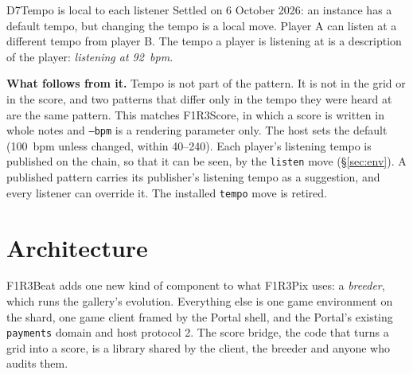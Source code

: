\documentclass[11pt,a4paper]{article}
\newcommand{\code}[1]{\texttt{#1}}
\begin{document}
\begin{settled}{D7}{Tempo is local to each listener}
Settled on 6 October 2026: an instance has a default tempo, but changing the tempo is a local
move. Player A can listen at a different tempo from player B. The tempo a player is listening
at is a description of the player: \emph{listening at 92~bpm}.

\textbf{What follows from it.} Tempo is not part of the pattern. It is not in the grid or in
the score, and two patterns that differ only in the tempo they were heard at are the same
pattern. This matches F1R3Score, in which a score is written in whole notes and \code{--bpm} is
a rendering parameter only. The host sets the default (100~bpm unless changed, within
40--240). Each player's listening tempo is published on the chain, so that it can be seen, by
the \code{listen} move (\S\ref{sec:env}). A published pattern carries its publisher's listening
tempo as a suggestion, and every listener can override it. The installed \code{tempo} move is
retired.
\end{settled}
\section{Architecture}\label{sec:arch}

F1R3Beat adds one new kind of component to what F1R3Pix uses: a \emph{breeder}, which runs the
gallery's evolution. Everything else is one game environment on the shard, one game client
framed by the Portal shell, and the Portal's existing \code{payments} domain and host protocol
2. The score bridge, the code that turns a grid into a score, is a library shared by the client,
the breeder and anyone who audits them.
\end{document}
